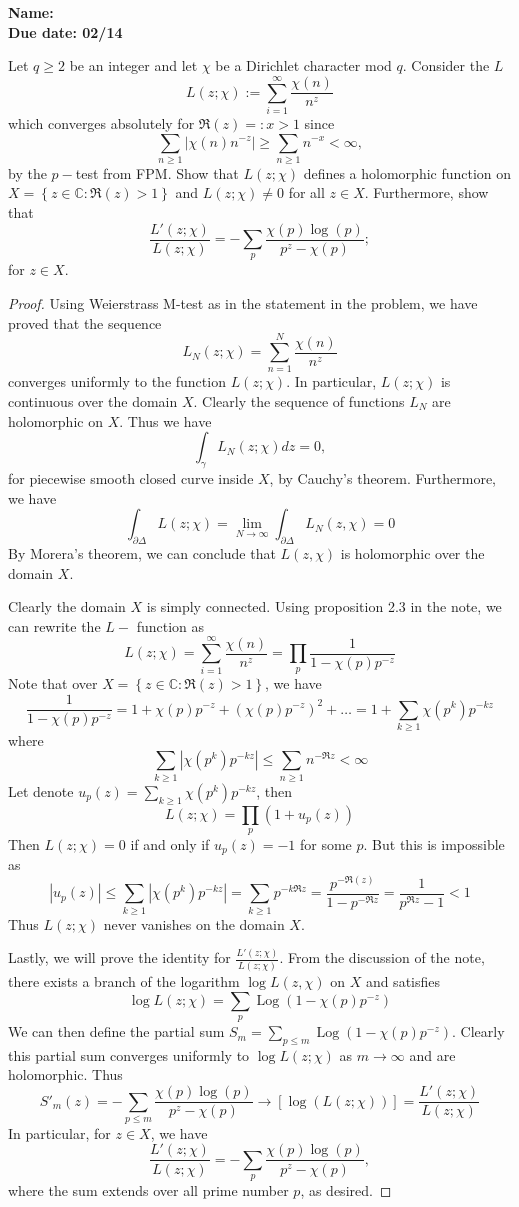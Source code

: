 \documentclass[11pt,letterpaper]{article}
\newcommand{\homework}[2]{\noindent\textbf{Name: }{} \hfill \textbf{} \\  \textbf{Due date: #2} \hfill \textbf{}\\}
\newcounter{problem}
\DeclareMathOperator{\1}{\mathbbm{1}}
\DeclareMathOperator{\Log}{Log}
\begin{document}
\homework{\#}{02/14}


\begin{exercise}
  Let $q \ge 2$ be an integer and let $\chi$ be a Dirichlet character mod $q$. Consider the $L$
  \[L(z;\chi) := \sum_{i=1}^\infty \dfrac{\chi(n)}{n^z}\]
  which converges absolutely for $\Re(z)=:x >1$ since
  \[ \sum_{n\ge 1 }|\chi(n)n^{-z}| \ge \sum_{n\ge 1} n^{-x} <\infty,\]
  by the $p-$test from FPM. Show that $L(z;\chi)$ defines a holomorphic function on $X = \left\lbrace z \in \mathbb{C}: \Re(z)>1 \right\rbrace$
  and $L(z;\chi) \ne 0$ for all $z \in X$. Furthermore, show that
  \[\dfrac{L'(z;\chi)}{L(z;\chi)} = - \sum_p \dfrac{\chi(p)\log(p)}{p^z-\chi(p)};\]
  for $z \in X$.
\end{exercise}
\begin{proof}
  \hfill
  Using Weierstrass M-test as in the statement in the problem, we have proved that the sequence
  \[ L_N(z;\chi) = \sum_{n=1}^N \dfrac{\chi(n)}{n^z}\]
  converges uniformly to the function $L(z;\chi)$. In particular, $L(z;\chi)$ is continuous
  over the domain $X$. Clearly the sequence of functions $L_N$ are holomorphic on $X$. Thus we have
  \[\int_{\gamma} L_N(z; \chi)dz = 0,\]
  for piecewise smooth closed curve inside $X$, by Cauchy's theorem. Furthermore, we have
  \[\int_{\partial \Delta} L(z;\chi) = \lim_{N \to \infty} \int_{\partial \Delta} L_N(z,\chi) =0\]
  By Morera's theorem, we can conclude that $L(z,\chi)$ is holomorphic over the domain $X$.

  Clearly the domain $X$ is simply connected. Using proposition 2.3 in the note, we can rewrite the $L-$ function as
  \[L(z;\chi ) = \sum_{i=1}^\infty \dfrac{\chi(n)}{n^z} = \prod_p \dfrac{1}{1-\chi(p)p^{-z}}\]
  Note that over $X= \left\lbrace z \in \mathbb{C}: \Re(z)>1 \right\rbrace$, we have
  \[\dfrac{1}{1-\chi(p)p^{-z}} = 1+ \chi(p)p^{-z}+ (\chi(p)p^{-z})^2+\ldots = 1+ \sum_{k\ge 1} \chi(p^k)p^{-kz}\]
  where
  \[\sum_{k\ge 1} |\chi(p^k)p^{-kz}| \le \sum_{n \ge 1} n^{-\Re z}<\infty\]
  Let denote $u_p(z)= \sum_{k\ge 1} \chi(p^k)p^{-kz}$, then
  \[L(z;\chi) = \prod_p \left(1+u_p(z)\right)\]
  Then $L(z;\chi)=0$ if and only if $u_p(z) =-1$ for some $p$. But this is impossible as
  \[|u_p(z)| \le \sum_{k\ge 1} |\chi(p^k)p^{-kz}| = \sum_{k\ge 1} p^{-k\Re z} = \dfrac{p^{-\Re (z)}}{1-p^{-\Re z}} =\dfrac{1}{p^{\Re z}-1} <1\]
  Thus $L(z;\chi)$ never vanishes on the domain $X$.

  Lastly, we will prove the identity for $\frac{L'(z;\chi)}{L(z;\chi)}$. From the discussion of the note,
  there exists a branch of the logarithm $\log L(z,\chi)$ on $X$ and satisfies
  \[\log L(z;\chi) = \sum_p \Log(1-\chi(p)p^{-z})\]
  We can then define the partial sum $S_m = \sum_{p\le m} \Log(1-\chi(p)p^{-z})$. Clearly this partial sum converges uniformly to
  $\log L(z;\chi)$ as $m \to \infty$ and are holomorphic. Thus
  \[S'_m(z) = -\sum_{p \le m} \dfrac{\chi(p)\log(p)}{p^z-\chi(p)} \to \left[\log(L(z;\chi))\right] = \dfrac{L'(z;\chi)}{L(z;\chi)}\]
  In particular, for $z \in X$, we have
  \[\dfrac{L'(z;\chi)}{L(z;\chi)}= -\sum_{p } \dfrac{\chi(p)\log(p)}{p^z-\chi(p)},\]
  where the sum extends over all prime number $p$, as desired.
\end{proof}
\end{document}
